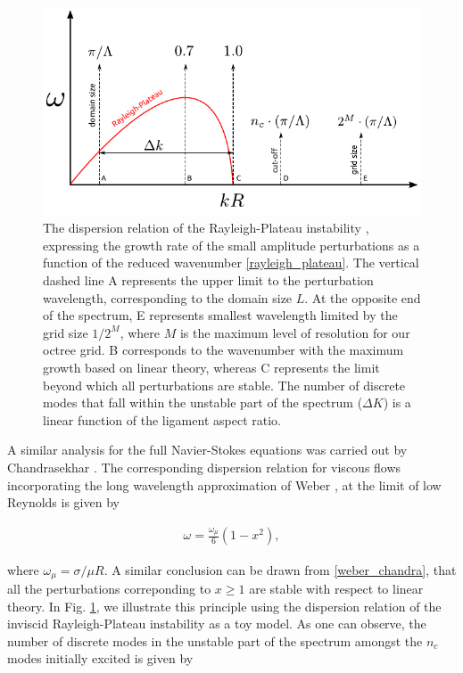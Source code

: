 \begin{figure}
\centering
\includegraphics{plots/ligament_breakup/wave_quant.pdf}
\caption{ The dispersion relation of the Rayleigh-Plateau instability 
	\cite{rayleigh1879a, plateau1849}, expressing the growth rate of 
	the small amplitude perturbations as a function of 
	the reduced wavenumber \eqref{rayleigh_plateau}.
	The vertical dashed line A represents the upper limit
	to the perturbation wavelength, corresponding to the domain size $L$. 
	At the opposite end of the spectrum, E represents smallest wavelength  
        limited by the grid size $1/2^M$, where $M$ is the maximum level of 
	resolution for our octree grid. B corresponds to the wavenumber with 
	the maximum growth based on linear theory, whereas C represents the limit
	beyond which all perturbations are stable. The number of discrete modes
	that fall within the unstable part of the spectrum ($\Delta K$) 
	is a linear function of the ligament aspect ratio. 
	}
\label{quant}
\end{figure}

A similar analysis for the full Navier-Stokes equations 
was carried out by Chandrasekhar \cite{chandra}. 
The corresponding dispersion relation for viscous 
flows incorporating the long wavelength approximation 
of Weber \cite{weber1931}, at the limit of low Reynolds is given by

\begin{align}
\omega = \frac{\omega_\mu}{6}\left(1 - x^2 \right) , 
\label{weber_chandra}
\end{align}

where $\omega_\mu = \sigma / \mu R $. 
A similar conclusion can be drawn from \eqref{weber_chandra},
that all the perturbations correponding to $x \geq 1 $ are 
stable with respect to linear theory. 
\marginnote{
}
In Fig. \ref{quant}, we illustrate this principle using the dispersion 
relation of the inviscid Rayleigh-Plateau instability as a toy model. 
As one can observe, the number of discrete modes in the unstable part
of the spectrum amongst the $n_c$ modes initially excited is given by 


